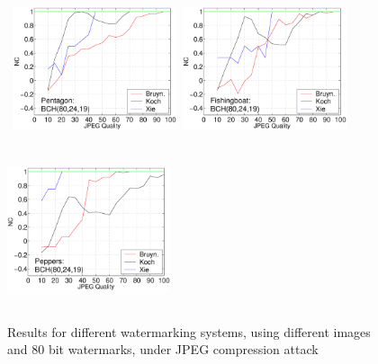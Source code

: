 \documentclass[12pt]{report}
\begin{document}
\begin{figure}[p]
{{}}
\centerline{ \hbox{
        \includegraphics[height=4.6cm,width=4.8cm]{BKX_EPS_formattedBetter/Pentagon80_24_19.eps}
        \includegraphics[height=4.6cm,width=4.8cm]{BKX_EPS_formattedBetter/Fishingboat80_24_19.eps}
        \includegraphics[height=4.6cm,width=4.8cm]{BKX_EPS_formattedBetter/Peppers80_24_19.eps}
}} 

        \caption{Results for different watermarking systems, using different images and 80 bit watermarks, 
	under JPEG compression attack}
        \label{fig:80BKX}
\setlength{\abovecaptionskip}{0cm}
\end{figure}
\end{document}
